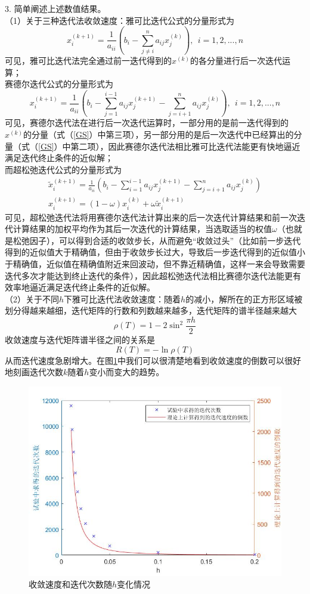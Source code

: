 \documentclass[10pt,a4paper]{article}
\begin{document}
3. 简单阐述上述数值结果。\\
（1）关于三种迭代法收敛速度：雅可比迭代公式的分量形式为
\[
x_i^{(k+1)}=\frac{1}{a_{ii}}(b_i-\sum_{j\neq i}^na_{ij}x_j^{(k)}),~~i=1,2,...,n
\]
可见，雅可比迭代法完全通过前一迭代得到的$x^{(k)}$的各分量进行后一次迭代运算；\\
赛德尔迭代公式的分量形式为
\begin{equation}
\label{GS}
x_i^{(k+1)}=\frac{1}{a_{ii}}(b_i-\sum_{j=1}^{i-1}a_{ij}x_j^{(k+1)}-\sum_{j=i+1}^na_{ij}x_j^{(k)}),~~i=1,2,...,n
\end{equation}
可见，赛德尔迭代法在进行后一次迭代运算时，一部分用的是前一迭代得到的$x^{(k)}$的分量（式（\ref{GS}）中第三项），另一部分用的是后一次迭代中已经算出的分量（式（\ref{GS}）中第二项），因此赛德尔迭代法相比雅可比迭代法能更有快地逼近满足迭代终止条件的近似解；\\
而超松弛迭代公式的分量形式为
\begin{gather*}
\widetilde{x}_i^{(k+1)}=\frac{1}{a_{ii}}(b_i-\sum_{i=1}^{i-1}a_{ij}x_j^{(k+1)}-\sum_{j=i+1}^na_{ij}x_j^{(k)})\\
x_i^{(k+1)}=(1-\omega)x_i^{(k)}+\omega\widetilde{x}_i^{(k+1)}
\end{gather*}
可见，超松弛迭代法将用赛德尔迭代法计算出来的后一次迭代计算结果和前一次迭代计算结果的加权平均作为其后一次迭代的计算结果，当选取适当的权值$\omega$（也就是松弛因子），可以得到合适的收敛步长，从而避免“收敛过头”（比如前一步迭代得到的近似值大于精确值，但由于收敛步长过大，导致后一步迭代得到的近似值小于精确值，近似值在精确值附近来回波动，但不靠近精确值，这样一来会导致需要迭代多次才能达到终止迭代的条件），因此超松弛迭代法相比赛德尔迭代法能更有效率地逼近满足迭代终止条件的近似解。\\
（2）关于不同$h$下雅可比迭代法收敛速度：随着$h$的减小，解所在的正方形区域被划分得越来越细，迭代矩阵的行数和列数越来越多，迭代矩阵的谱半径越来越大
\[
\rho(T)=1-2\sin^2\frac{\pi h}{2}
\]
收敛速度与迭代矩阵谱半径之间的关系是
\[
R(T)=-\ln\rho(T)
\]
从而迭代速度急剧增大。在图\ref{jacobivarh}中我们可以很清楚地看到收敛速度的倒数可以很好地刻画迭代次数$k$随着$h$变小而变大的趋势。
\begin{figure}[h]
\centering
\includegraphics[scale=.5]{jacobivarh.jpg}
\caption{收敛速度和迭代次数随$h$变化情况} \label{jacobivarh}
\end{figure}
\end{document}
